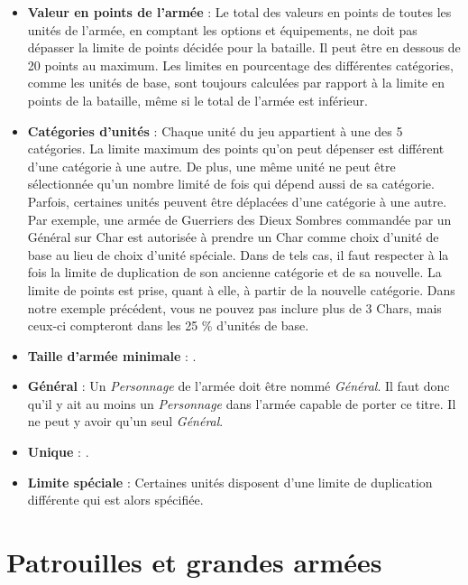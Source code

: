 \begin{itemize}[label={-}]
\item \textbf{Valeur en points de l'armée} : Le total des valeurs en points de toutes les unités de l'armée, en comptant les options et équipements, ne doit pas dépasser la limite de points décidée pour la bataille. Il peut être en dessous de 20 points au maximum. Les limites en pourcentage des différentes catégories, comme les unités de base, sont toujours calculées par rapport à la limite en points de la bataille, même si le total de l'armée est inférieur.
\item \textbf{Catégories d'unités} : Chaque unité du jeu appartient à une des 5 catégories. La limite maximum des points qu'on peut dépenser est différent d'une catégorie à une autre. De plus, une même unité ne peut être sélectionnée qu'un nombre limité de fois qui dépend aussi de sa catégorie. Parfois, certaines unités peuvent être déplacées d'une catégorie à une autre. Par exemple, une armée de Guerriers des Dieux Sombres commandée par un Général sur Char est autorisée à prendre un Char comme choix d'unité de base au lieu de choix d'unité spéciale. Dans de tels cas, il faut respecter à la fois la limite de duplication de son ancienne catégorie et de sa nouvelle. La limite de points est prise, quant à elle, à partir de la nouvelle catégorie. Dans notre exemple précédent, vous ne pouvez pas inclure plus de 3 Chars, mais ceux-ci compteront dans les 25 \% d'unités de base.
\item \textbf{Taille d'armée minimale} : .
\item \textbf{Général} : Un \emph{Personnage} de l'armée doit être nommé \emph{Général}. Il faut donc qu'il y ait au moins un \emph{Personnage} dans l'armée capable de porter ce titre. Il ne peut y avoir qu'un seul \emph{Général}.
\item \textbf{Unique} : .
\item \textbf{Limite spéciale} : Certaines unités disposent d'une limite de duplication différente qui est alors spécifiée.
\end{itemize}

\section{Patrouilles et grandes armées}

